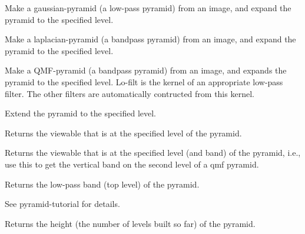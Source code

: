 \begin{description}
\item{}
Make a gaussian-pyramid (a low-pass pyramid) from an image, and expand
the pyramid to the specified level.

\item{}

\item{}
Make a laplacian-pyramid (a bandpass pyramid) from an image, and
expand the pyramid to the specified level.

\item{}

\item{}
Make a QMF-pyramid (a bandpass pyramid) from an image, and expands the
pyramid to the specified level.  Lo-filt is the kernel of an
appropriate low-pass filter.  The other filters are automatically
contructed from this kernel.

\item{}

\item{}
Extend the pyramid to the specified level.

\item{}
Returns the viewable that is at the specified level of the pyramid.

\item{}
Returns the viewable that is at the specified level (and band) of the
pyramid, i.e., use this to get the vertical band on the second level
of a qmf pyramid.

\item{}
Returns the low-pass band (top level) of the pyramid.

\item{}
See pyramid-tutorial for details.

\item{}
Returns the height (the number of levels built so far) of the
pyramid.
\end{description}




